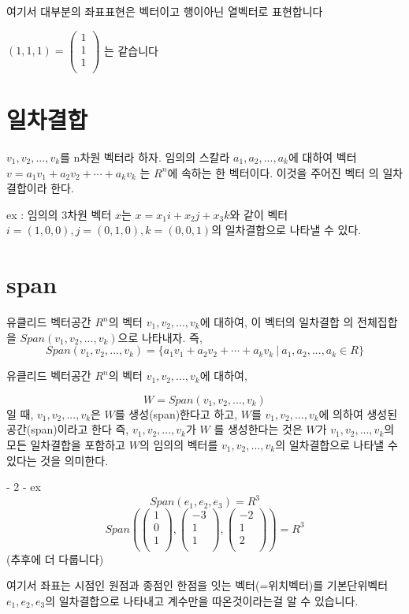 \documentclass{oblivoir}
\newcommand{\onetok}[1]{ {#1}_1, {#1}_2, ... , {#1}_k}
\newcommand{\sumtok}[2]{  {#1}_1{#2}_1 + {#1}_2{#2}_2 + \cdots + {#1}_k{#2}_k}
\newcommand{\cvecthree}[3]{ \begin{pmatrix}    {#1} \\    {#2} \\    {#3} \\ \end{pmatrix}}
\begin{document}
    
여기서 대부분의 좌표표현은 벡터이고 행이아닌 열벡터로 표현합니다

$ (1, 1, 1)  =  \cvecthree{1}{1}{1} $
는 같습니다

\section{일차결합}
\begin{dfn}[일차결합]
    $\onetok{v}$를 n차원 벡터라 하자. 임의의 스칼라 $\onetok{a}$에 대하여
    벡터 $v = \sumtok{a}{v}$ 는 $R^n$에 속하는 한 벡터이다. 이것을 주어진 벡터 
    의 일차결합이라 한다.   
\end{dfn}

ex : 임의의 3차원 벡터 $x$는 $x = x_1i + x_2j + x_3k$와 같이 벡터 $ i = (1,0,0) , j = (0,1,0), k = (0,0,1)$의 일차결합으로 나타낼 수 있다.

\reversemarginpar
{}





\section {span}

\begin{dfn}[span]
    
유클리드 벡터공간 $R^n$의 벡터 $\onetok{v}$에 대하여, 이 벡터의 일차결합 의 전체집합을 $Span(\onetok{v})$으로 나타내자. 즉,
\[
    Span(\onetok{v}) =\{ \sumtok{a}{v} \:|\: \onetok{a} \in R\}
\]

유클리드 벡터공간 $R^n$의 벡터 $\onetok{v}$에 대하여,

\[
    W = Span(\onetok{v})
\]
일 때, $\onetok{v}$은 $W$를 생성(span)한다고 하고, $W$를 $\onetok{v}$에 의하여 생성된 공간(span)이라고 한다 즉, $\onetok{v}$가 $W$ 를 생성한다는 것은  $W$가 $\onetok{v}$의 모든 일차결합을 포함하고 $W$의 임의의 벡터를 $\onetok{v}$의 일차결합으로 나타낼 수 있다는 것을 의미한다.
\end{dfn}

- 2 -
ex
\[
    Span(e_1, e_2, e_3) = R^3
\]
\[
    Span(\cvecthree{1}{0}{1},\cvecthree{-3}{1}{1},\cvecthree{-2}{1}{2}) = R^3
\]
 (추후에 더 다룹니다)

여기서 좌표는 시점인 원점과 종점인 한점을 잇는 벡터(=위치벡터)를 기본단위벡터 $e_1, e_2, e_3$의 일차결합으로 나타내고 계수만을 따온것이라는걸 알 수 있습니다.
\end{document}
